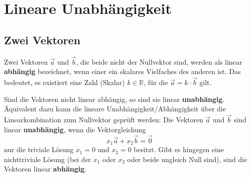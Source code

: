 \chapter{Lineare Unabhängigkeit}

\section{Zwei Vektoren}

Zwei Vektoren $\vec{a}$ und $\vec{b}$, die beide nicht der Nullvektor sind, werden als linear \textbf{abhängig} bezeichnet, wenn einer ein skalares Vielfaches des anderen ist. Das bedeutet, es existiert eine Zahl (Skalar) $k \in \mathbb{R}$, für die $\vec{a} = k \cdot \vec{b}$ gilt.

Sind die Vektoren nicht linear abhängig, so sind sie linear \textbf{unabhängig}.
Äquivalent dazu kann die lineare Unabhängigkeit/Abhängigkeit über die Linearkombination zum Nullvektor geprüft werden:
Die Vektoren $\vec{a}$ und $\vec{b}$ sind linear \textbf{unabhängig}, wenn die Vektorgleichung
\[ x_1 \vec{a} + x_2 \vec{b} = \vec{0} \]
nur die triviale Lösung $x_1 = 0$ und $x_2 = 0$ besitzt. Gibt es hingegen eine nichttriviale Lösung (bei der $x_1$ oder $x_2$ oder beide ungleich Null sind), sind die Vektoren linear \textbf{abhängig}.

